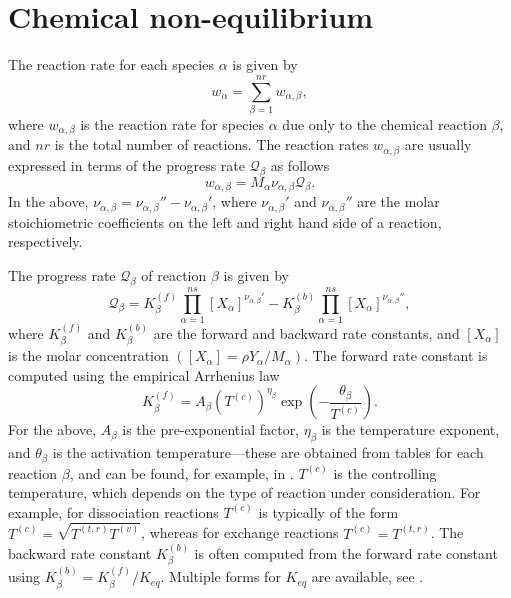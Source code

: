 \documentclass[oneside,a4paper,11pt]{report}
\begin{document}
\section{Chemical non-equilibrium}
The reaction rate for each species $\alpha$ is given by
\begin{equation}
w_\alpha = \sum_{\beta = 1}^{nr} w_{\alpha, \beta},
\end{equation}
where $w_{\alpha, \beta}$ is the reaction rate for species $\alpha$ due only to the chemical reaction $\beta$, and $nr$ is the total number of reactions. The reaction rates $w_{\alpha,\beta}$ are usually expressed in terms of the progress rate $\mathcal{Q}_\beta$ as follows
\begin{equation}
w_{\alpha,\beta} = M_\alpha \nu_{\alpha, \beta} \mathcal{Q}_\beta.
\end{equation}
In the above, $\nu_{\alpha,\beta} = \nu_{\alpha,\beta}'' - \nu_{\alpha,\beta}'$, where $\nu_{\alpha,\beta}'$ and $\nu_{\alpha,\beta}''$ are the molar stoichiometric coefficients on the left and right hand side of a reaction, respectively.

The progress rate $\mathcal{Q}_\beta$ of reaction $\beta$ is given by
\begin{equation}
\mathcal{Q}_\beta = K^{(f)}_\beta \prod_{\alpha = 1}^{ns} [ X_\alpha ]^{\nu_{\alpha, \beta}'} - K^{(b)}_\beta \prod_{\alpha = 1}^{ns} [X_\alpha]^{\nu_{\alpha, \beta}''},
\end{equation}
where $K^{(f)}_\beta$ and $K^{(b)}_\beta$ are the forward and backward rate constants, and $[X_\alpha]$ is the molar concentration $([X_\alpha] = \rho Y_\alpha / M_\alpha)$. The forward rate constant is computed using the empirical Arrhenius law
\begin{equation}
K^{(f)}_\beta = A_\beta \left ( T^{(c)} \right)^{\eta_\beta} \exp \left ( -\frac{\theta_\beta}{T^{(c)}} \right ).
\end{equation}
For the above, $A_\beta$ is the pre-exponential factor, $\eta_\beta$ is the temperature exponent, and $\theta_\beta$ is the activation temperature---these are obtained from tables for each reaction $\beta$, and can be found, for example, in \cite{park1993}. $T^{(c)}$ is the controlling temperature, which depends on the type of reaction under consideration. For example, for dissociation reactions $T^{(c)}$ is typically of the form $T^{(c)} = \sqrt{ T^{(t,r)} T^{(v)}}$, whereas for exchange reactions $T^{(c)} = T^{(t,r)}$. The backward rate constant $K^{(b)}_\beta$ is often computed from the forward rate constant using $K^{(b)}_\beta = K^{(f)}_\beta / K_{eq}$. Multiple forms for $K_{eq}$ are available, see \cite{poinsot2012,knisely2018}.
\end{document}
